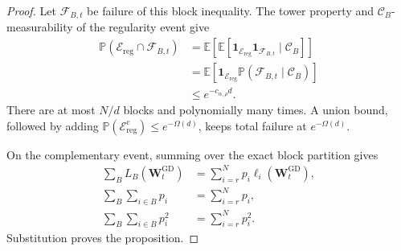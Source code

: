 \documentclass[11pt]{article}
\theoremstyle{definition}
\newcommand{\Wb}{\mathbf{W}}
\newcommand{\EE}{\mathbb{E}}
\newcommand{\PP}{\mathbb{P}}
\newcommand{\eps}{\varepsilon}
\begin{document}
\begin{proof}
Let $\mathcal F_{B,t}$ be failure of this block inequality.  The tower
property and $\mathcal C_B$-measurability of the regularity event give
\begin{align*}
 \PP(\mathcal E_{\mathrm{reg}}\cap\mathcal F_{B,t})
 &=\EE\!\left[
  \EE[\mathbf{1}_{\mathcal E_{\mathrm{reg}}}
      \mathbf{1}_{\mathcal F_{B,t}}\mid\mathcal C_B]
 \right]\\
 &=\EE\!\left[
  \mathbf{1}_{\mathcal E_{\mathrm{reg}}}
  \PP(\mathcal F_{B,t}\mid\mathcal C_B)
 \right]\\
 &\leq e^{-c_{\alpha,\rho}d}.
\end{align*}
There are at most $N/d$ blocks and polynomially many times.  A union bound,
followed by adding
$\PP(\mathcal E_{\mathrm{reg}}^c)\leq e^{-\Omega(d)}$, keeps total failure
at $e^{-\Omega(d)}$.

On the complementary event, summing over the exact block partition gives
\begin{align*}
 \sum_B L_B(\Wb_t^{\mathrm{GD}})
 &=\sum_{i=r}^Np_i\ell_i(\Wb_t^{\mathrm{GD}}),\\
 \sum_B\sum_{i\in B}p_i
 &=\sum_{i=r}^Np_i,\\
 \sum_B\sum_{i\in B}p_i^2
 &=\sum_{i=r}^Np_i^2.
\end{align*}
Substitution proves the proposition.
\end{proof}



\end{document}
